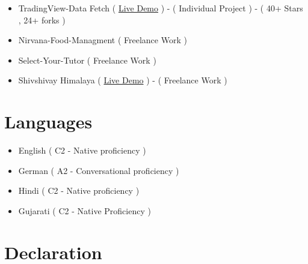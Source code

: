 \documentclass[a4paper,11pt]{article}
\newcommand{\resumeItem}[2]{
  \item{
    \textbf{#1}{\hspace{0.5mm}#2 \vspace{-0.5mm}}
  }
}
\newcommand{\resumeSubItem}[2]{\resumeItem{#1}{#2}\vspace{-4pt}}
\newcommand{\resumeHeadingSkillStart}{\begin{itemize}[leftmargin=*,itemsep=1.7mm, rightmargin=2ex]}
\newcommand{\resumeHeadingSkillEnd}{\end{itemize}\vspace{-2mm}}
\begin{document}
\vspace{1mm} %

 \resumeHeadingSkillStart
  \resumeSubItem{}
    {TradingView-Data Fetch} ({ \href{https://github.com/ravalmeet/TradingView-Data}{Live Demo} }) - ( Individual Project ) - ( 40+ Stars , 24+ forks  )
  \resumeSubItem{}
     {Nirvana-Food-Managment  ( Freelance Work )  }
  \resumeSubItem{}
     {Select-Your-Tutor  ( Freelance Work )  }
     \resumeSubItem{}
     {Shivshivay Himalaya  ({ \href{https://shivshivay.com}{Live Demo} }) - ( Freelance Work )  }
 \resumeHeadingSkillEnd

\section{\textbf{Languages}}

\vspace{1mm} %

 \resumeHeadingSkillStart
  \resumeSubItem{}
    {English { }( C2 - Native proficiency )}
  \resumeSubItem{}
    {German  ( A2 - Conversational proficiency )}
  \resumeSubItem{}
    {Hindi { }{ }{ }{ }( C2 - Native proficiency )}
  \resumeSubItem{}
    {Gujarati { } ( C2 - Native Proficiency )}
 \resumeHeadingSkillEnd

\section{\textbf{Declaration}}
\vspace{1mm}

\end{document}

